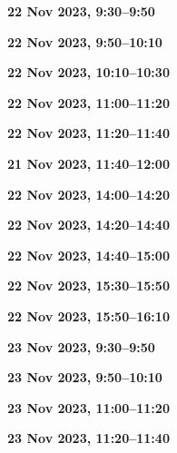 \documentclass[12pt]{extbook}
\newcommand{\breaktime}[1]{
\bigskip
\begin{center}
\Large\bfseries ***** Break #1 *****
\end{center}
\bigskip}
\renewcommand{\breaktime}[1]{}
\newcommand{\abstract}[2]{{
\bigskip
\begin{center}
\large\bfseries #1
\end{center}}
\par

\clearpage
}
\begin{document}
\abstract{22 Nov 2023, 9:30--9:50}{abstracts/Jacops} %
\abstract{22 Nov 2023, 9:50--10:10}{abstracts/Tomonaga} %
\abstract{22 Nov 2023, 10:10--10:30}{abstracts/Kim} %

\breaktime{30 min}

\abstract{22 Nov 2023, 11:00--11:20}{abstracts/vanLeeuw} %
\abstract{22 Nov 2023, 11:20--11:40}{abstracts/Currle} %
\abstract{21 Nov 2023, 11:40--12:00}{abstracts/Finger}

\breaktime{ / Lunch}

\abstract{22 Nov 2023, 14:00--14:20}{abstracts/Brennwald} %
\abstract{22 Nov 2023, 14:20--14:40}{abstracts/Blanc} %
\abstract{22 Nov 2023, 14:40--15:00}{abstracts/Marion} %

\breaktime{30 min}

\abstract{22 Nov 2023, 15:30--15:50}{abstracts/Picard} %
\abstract{22 Nov 2023, 15:50--16:10}{abstracts/Engelhardt} %



\abstract{23 Nov 2023, 9:30--9:50}{abstracts/Musy} %
\abstract{23 Nov 2023, 9:50--10:10}{abstracts/GroegerTrampe} %

\breaktime{30 min}

\abstract{23 Nov 2023, 11:00--11:20}{abstracts/Iwe} %
\abstract{23 Nov 2023, 11:20--11:40}{abstracts/Slagter} %
\end{document}
